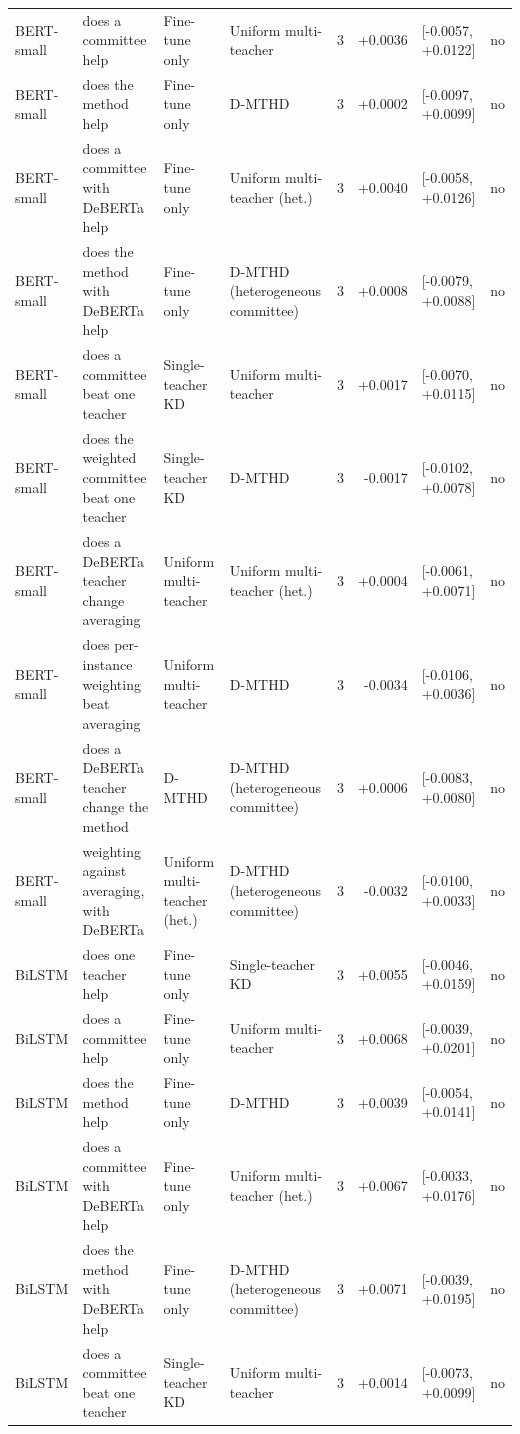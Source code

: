 \begin{table}[t]
\begin{tabular}{llllrrll}
BERT-small & does a committee help & Fine-tune only & Uniform multi-teacher & 3 & +0.0036 & [-0.0057, +0.0122] & no \\
BERT-small & does the method help & Fine-tune only & D-MTHD & 3 & +0.0002 & [-0.0097, +0.0099] & no \\
BERT-small & does a committee with DeBERTa help & Fine-tune only & Uniform multi-teacher (het.) & 3 & +0.0040 & [-0.0058, +0.0126] & no \\
BERT-small & does the method with DeBERTa help & Fine-tune only & D-MTHD (heterogeneous committee) & 3 & +0.0008 & [-0.0079, +0.0088] & no \\
BERT-small & does a committee beat one teacher & Single-teacher KD & Uniform multi-teacher & 3 & +0.0017 & [-0.0070, +0.0115] & no \\
BERT-small & does the weighted committee beat one teacher & Single-teacher KD & D-MTHD & 3 & -0.0017 & [-0.0102, +0.0078] & no \\
BERT-small & does a DeBERTa teacher change averaging & Uniform multi-teacher & Uniform multi-teacher (het.) & 3 & +0.0004 & [-0.0061, +0.0071] & no \\
BERT-small & does per-instance weighting beat averaging & Uniform multi-teacher & D-MTHD & 3 & -0.0034 & [-0.0106, +0.0036] & no \\
BERT-small & does a DeBERTa teacher change the method & D-MTHD & D-MTHD (heterogeneous committee) & 3 & +0.0006 & [-0.0083, +0.0080] & no \\
BERT-small & weighting against averaging, with DeBERTa & Uniform multi-teacher (het.) & D-MTHD (heterogeneous committee) & 3 & -0.0032 & [-0.0100, +0.0033] & no \\
BiLSTM & does one teacher help & Fine-tune only & Single-teacher KD & 3 & +0.0055 & [-0.0046, +0.0159] & no \\
BiLSTM & does a committee help & Fine-tune only & Uniform multi-teacher & 3 & +0.0068 & [-0.0039, +0.0201] & no \\
BiLSTM & does the method help & Fine-tune only & D-MTHD & 3 & +0.0039 & [-0.0054, +0.0141] & no \\
BiLSTM & does a committee with DeBERTa help & Fine-tune only & Uniform multi-teacher (het.) & 3 & +0.0067 & [-0.0033, +0.0176] & no \\
BiLSTM & does the method with DeBERTa help & Fine-tune only & D-MTHD (heterogeneous committee) & 3 & +0.0071 & [-0.0039, +0.0195] & no \\
BiLSTM & does a committee beat one teacher & Single-teacher KD & Uniform multi-teacher & 3 & +0.0014 & [-0.0073, +0.0099] & no \\

\end{tabular}
\end{table}
